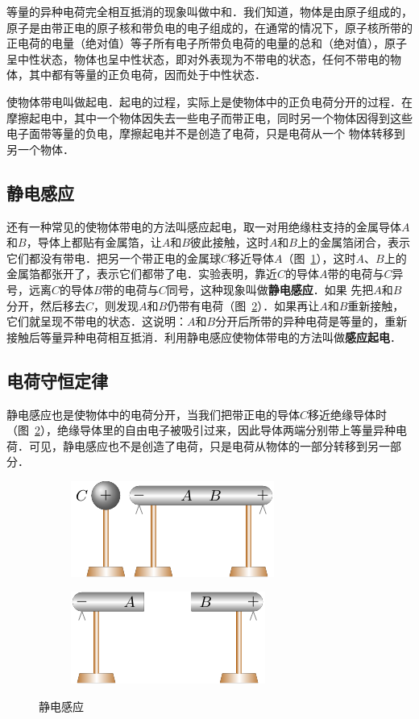 等量的异种电荷完全相互抵消的现象叫做中和．我们知道，物体是由原子组成的，原子是由带正电的原子核和带负电的电子组成的，在通常的情况下，原子核所带的正电荷的电量（绝对值）等子所有电子所带负电荷的电量的总和（绝对值），原子呈中性状态，物体也呈中性状态，即对外表现为不带电的状态，任何不带电的物体，其中都有等量的正负电荷，因而处于中性状态．

使物体带电叫做起电．起电的过程，实际上是使物体中的正负电荷分开的过程．在摩擦起电中，其中一个物体因失去一些电子而带正电，同时另一个物体因得到这些电子面带等量的负电，摩擦起电并不是创造了电荷，只是电荷从一个
物体转移到另一个物体．

\subsection{静电感应} 

还有一种常见的使物体带电的方法叫感应起电，取一对用绝缘柱支持的金属导体$A$和$B$，导体上都贴有金属箔，让$A$和$B$彼此接触，这时$A$和$B$上的金属箔闭合，表示它们都没有带电．把另一个带正电的金属球$C$移近导体$A$（图~\ref{fig_B_6-2a}），这时$A$、$B$上的金属箔都张开了，表示它们都带了电．实验表明，靠近$C$的导体$A$带的电荷与$C$异号，远离$C$的导体$B$带的电荷与$C$同号，这种现象叫做\textbf{静电感应}．如果
先把$A$和$B$分开，然后移去$C$，则发现$A$和$B$仍带有电荷（图~\ref{fig_B_6-2b}）．如果再让$A$和$B$重新接触，它们就呈现不带电的状态．这说明：$A$和$B$分开后所带的异种电荷是等量的，重新接触后等量异种电荷相互抵消．利用静电感应使物体带电的方法叫做\textbf{感应起电}．

\subsection{电荷守恒定律} 

静电感应也是使物体中的电荷分开，当我们把带正电的导体$C$移近绝缘导体时（图~\ref{fig_B_6-2b}），绝缘导体里的自由电子被吸引过来，因此导体两端分别带上等量异种电荷．可见，静电感应也不是创造了电荷，只是电荷从物体的一部分转移到另一部分．
\begin{figure}[htbp]
    \centering
    \begin{subfigure}{0.4\linewidth}
        \centering
        \includegraphics{fig/B/6-2a.pdf}
        \caption{}\label{fig_B_6-2a}
    \end{subfigure}
    \hfil
    \begin{subfigure}{0.4\linewidth}
        \centering
        \includegraphics{fig/B/6-2b.pdf}
        \caption{}\label{fig_B_6-2b}
    \end{subfigure}
    \caption{静电感应}\label{fig_B_6-2}
\end{figure}


